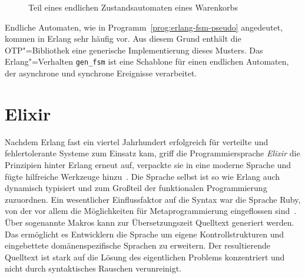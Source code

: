 \begin{figure}[!hbt]%
\caption{Teil eines endlichen Zustandsautomaten eines Warenkorbs}%
\label{fig:fsm-diag}%
\end{figure}

Endliche Automaten, wie in Programm~\ref{prog:erlang-fsm-pseudo} angedeutet, kommen in Erlang sehr häufig vor. Aus diesem Grund enthält die OTP"=Bibliothek eine generische Implementierung dieses Musters. Das Erlang"=Verhalten \lstinline{gen_fsm} ist eine Schablone für einen endlichen Automaten, der asynchrone und synchrone Ereignisse verarbeitet.

\section{Elixir}

Nachdem Erlang fast ein viertel Jahrhundert erfolgreich für verteilte und fehlertolerante Systeme zum Einsatz kam, griff die Programmiersprache \textit{Elixir} die Prinzipien hinter Erlang erneut auf, verpackte sie in eine moderne Sprache und fügte hilfreiche Werkzeuge hinzu~\cite[9-10]{Loder2016}. Die Sprache selbst ist so wie Erlang auch dynamisch typisiert und zum Großteil der funktionalen Programmierung zuzuordnen. Ein wesentlicher Einflussfaktor auf die Syntax war die Sprache Ruby, von der vor allem die Möglichkeiten für Metaprogrammierung eingeflossen sind~\cite{ValimGoto2014}. Über sogenannte Makros kann zur Übersetzungszeit Quelltext generiert werden. Das ermöglicht es Entwicklern die Sprache um eigene Kontrollstrukturen und eingebettete domänenspezifische Sprachen zu erweitern. Der resultierende Quelltext ist stark auf die Lösung des eigentlichen Problems konzentriert und nicht durch syntaktisches Rauschen verunreinigt.

